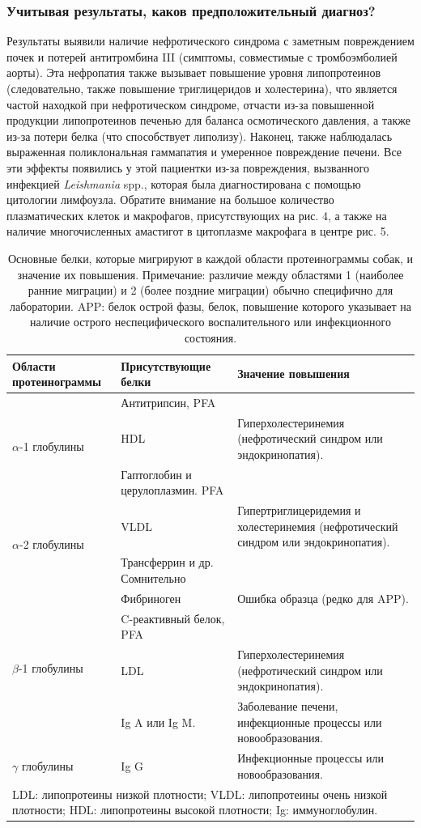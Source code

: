 \documentclass[a4paper,12pt]{book}
\begin{document}
\subsubsection*{Учитывая результаты, каков предположительный диагноз?}
Результаты выявили наличие нефротического синдрома с заметным повреждением почек и потерей антитромбина III (симптомы, совместимые с тромбоэмболией аорты). Эта нефропатия также вызывает повышение уровня липопротеинов (следовательно, также повышение триглицеридов и холестерина), что является частой находкой при нефротическом синдроме, отчасти из-за повышенной продукции липопротеинов печенью для баланса осмотического давления, а также из-за потери белка (что способствует липолизу). Наконец, также наблюдалась выраженная поликлональная гаммапатия и умеренное повреждение печени. Все эти эффекты появились у этой пациентки из-за повреждения, вызванного инфекцией \textit{Leishmania} spp., которая была диагностирована с помощью цитологии лимфоузла. Обратите внимание на большое количество плазматических клеток и макрофагов, присутствующих на рис. 4, а также на наличие многочисленных амастигот в цитоплазме макрофага в центре рис. 5.

\begin{table}[htbp]
\centering
\caption{Основные белки, которые мигрируют в каждой области протеинограммы собак, и значение их повышения. Примечание: различие между областями 1 (наиболее ранние миграции) и 2 (более поздние миграции) обычно специфично для лаборатории. APP: белок острой фазы, белок, повышение которого указывает на наличие острого неспецифического воспалительного или инфекционного состояния.}
\begin{tabular}{p{3cm}p{5cm}p{6cm}}
\toprule
Области протеинограммы & Присутствующие белки & Значение повышения \\
\midrule
\multirow{3}{*}{$\alpha$-1 глобулины} & Антитрипсин, PFA & \\
& HDL & Гиперхолестеринемия (нефротический синдром или эндокринопатия). \\
& Гаптоглобин и церулоплазмин. PFA & \\
\multirow{2}{*}{$\alpha$-2 глобулины} & VLDL & Гипертриглицеридемия и холестеринемия (нефротический синдром или эндокринопатия). \\
& Трансферрин и др. Сомнительно & \\
\multirow{4}{*}{$\beta$-1 глобулины} & Фибриноген & Ошибка образца (редко для APP). \\
& C-реактивный белок, PFA & \\
& LDL & Гиперхолестеринемия (нефротический синдром или эндокринопатия). \\
& Ig A или Ig M. & Заболевание печени, инфекционные процессы или новообразования. \\
$\gamma$ глобулины & Ig G & Инфекционные процессы или новообразования. \\
\bottomrule
\multicolumn{3}{l}{LDL: липопротеины низкой плотности; VLDL: липопротеины очень низкой плотности; HDL: липопротеины высокой плотности; Ig: иммуноглобулин.}
\end{tabular}
\end{table}
\end{document}
